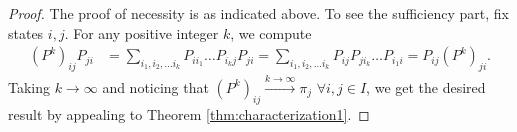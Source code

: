 \documentclass[a4paper,10pt,english]{article}
\begin{document}
\begin{proof}
The proof of necessity is as indicated above. To see the sufficiency part, fix states $i,j$. For any positive integer $k$, we compute
\begin{align*}
(P^k)_{ij}P_{ji}& = \sum_{i_1,i_2,\hdots i_{k}}P_{ii_1}\hdots P_{i_kj}P_{ji}=\sum_{i_1,i_2,\hdots i_{k}}P_{ij}P_{ji_k}\hdots P_{i_1 i}=P_{ij}(P^k)_{ji}. 
\end{align*}
Taking $k \to \infty$ and noticing that $(P^k)_{ij} \stackrel{k \to \infty}{\to} \pi_j$ $\forall i,j \in I$, we get the desired result by appealing to Theorem \ref{thm:characterization1}. 
\end{proof}
\end{document}
